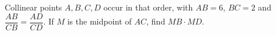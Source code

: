 Collinear points $A,B,C,D$ occur in that order, with $AB=6$, $BC=2$ and $\dfrac{AB}{CB}=\dfrac{AD}{CD}$. If $M$ is the midpoint of $AC$, find $MB\cdot MD$.
